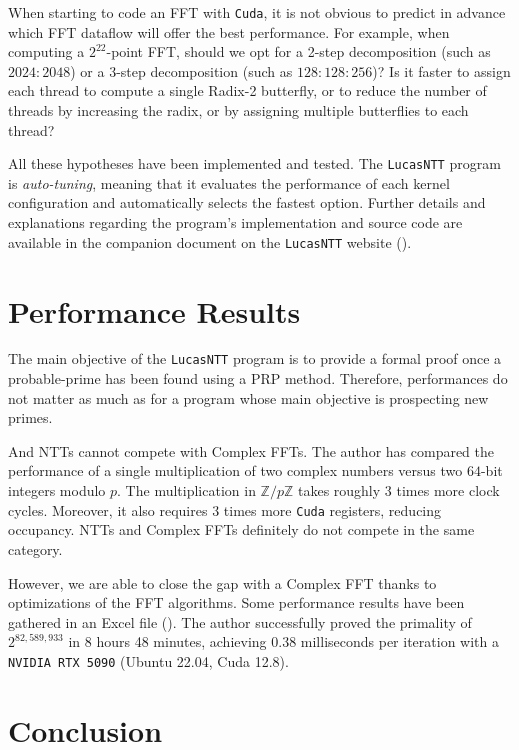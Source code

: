 \documentclass{article}
\begin{document}
When starting to code an FFT with \texttt{Cuda}, it is not obvious to predict in advance which FFT dataflow will offer the best performance. For example, when computing a $2^{22}$-point FFT, should we opt for a 2-step decomposition (such as $2024:2048$) or a 3-step decomposition (such as $128:128:256$)? Is it faster to assign each thread to compute a single Radix-2 butterfly, or to reduce the number of threads by increasing the radix, or by assigning multiple butterflies to each thread? 

All these hypotheses have been implemented and tested. The \texttt{LucasNTT} program is \emph{auto-tuning}, meaning that it evaluates the performance of each kernel configuration and automatically selects the fastest option. Further details and explanations regarding the program's implementation and source code are available in the companion document on the \texttt{LucasNTT} website (\cite{LucasNTT_documents}).

\section{Performance Results}

The main objective of the \texttt{LucasNTT} program is to provide a formal proof once a probable-prime has been found using a PRP method. Therefore, performances do not matter as much as for a program whose main objective is prospecting new primes.

And NTTs cannot compete with Complex FFTs. The author has compared the performance of a single multiplication of two complex numbers versus two $64$-bit integers modulo $p$. The multiplication in $\mathbb{Z}/p\mathbb{Z}$ takes roughly $3$ times more clock cycles. Moreover, it also requires $3$ times more \texttt{Cuda} registers, reducing occupancy. NTTs and Complex FFTs definitely do not compete in the same category.

However, we are able to close the gap with a Complex FFT thanks to optimizations of the FFT algorithms. Some performance results have been gathered in an Excel file (\cite{LucasNTT_FFT_Lengths}). The author successfully proved the primality of $2^{82,589,933}$ in 8 hours 48 minutes, achieving $0.38$ milliseconds per iteration with a \texttt{NVIDIA RTX 5090} (Ubuntu 22.04, Cuda 12.8). 

\section{Conclusion}
\end{document}
